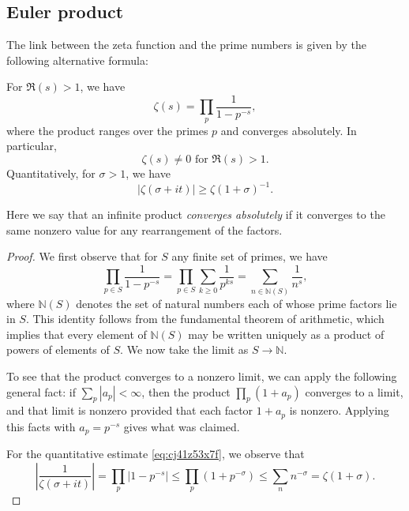 \documentclass[reqno]{amsart}  \numberwithin{theorem}{section} \numberwithin{equation}{section}
\begin{document}
\subsection{Euler product}\label{sec:cj4020t3kt}
The link between the zeta function and the prime numbers is given by the following alternative formula:
\begin{lemma}
  For $\Re(s) > 1$, we have
\begin{equation*}
\zeta(s) = \prod_p \frac{1}{1 - p^{- s}},
\end{equation*}
where the product ranges over the primes $p$ and converges absolutely.  In particular,
\begin{equation*}
\zeta(s) \neq 0 \text{ for } \Re(s) > 1.
\end{equation*}
Quantitatively, for $\sigma > 1$, we have
\begin{equation}\label{eq:cj41z53x7f}
\lvert \zeta(\sigma + it) \rvert \geq \zeta(1 + \sigma)^{-1}.
\end{equation}
\end{lemma}
Here we say that an infinite product \emph{converges absolutely} if it converges to the same nonzero value for any rearrangement of the factors.
\begin{proof}
  We first observe that for $S$ any finite set of primes, we have
  \begin{equation*}
    \prod_{p \in S}
    \frac{1}{1 - p^{- s}}
    = \prod_{p \in S}
    \sum_{k \geq 0} \frac{1}{ p^{k s}}
    =
    \sum_{n \in \mathbb{N}(S)}
    \frac{1}{n^s},
  \end{equation*}
  where $\mathbb{N}(S)$ denotes the set of natural numbers each of whose prime factors lie in $S$.  This identity follows from the fundamental theorem of arithmetic, which implies that every element of $\mathbb{N}(S)$ may be written uniquely as a product of powers of elements of $S$.  We now take the limit as $S \rightarrow \mathbb{N}$.

  To see that the product converges to a nonzero limit, we can apply the following general fact: if $\sum_p |a_p| < \infty$, then the product $\prod_{p} (1 + a_p)$ converges to a limit, and that limit is nonzero provided that each factor $1 + a_p$ is nonzero.  Applying this facts with $a_p = p^{-s}$ gives what was claimed.


  For the quantitative estimate \eqref{eq:cj41z53x7f}, we observe that
  \begin{equation*}
     \left\lvert \frac{1}{\zeta(\sigma + it)}  \right\rvert
     = \prod_p \left\lvert 1 - p^{-s} \right\rvert
     \leq \prod_p \left(  1 + p^{-\sigma} \right)
     \leq \sum_n n^{-\sigma} = \zeta(1 + \sigma).
  \end{equation*}
\end{proof}
\end{document}
